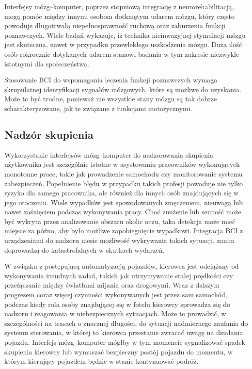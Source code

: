 \documentclass[skorowidz,skroty]{dyplomWEZUT}
\begin{document}
Interfejsy mózg--komputer, poprzez stopniową integrację z neurorehabilitacją, mogą pomóc między innymi osobom dotkniętym udarem mózgu, który często powoduje długotrwałą niepełnosprawność ruchową oraz zaburzenia funkcji poznawczych. Wiele badań wykazuje, iż technika nieinwazyjnej stymulacji mózgu jest skuteczna, nawet w przypadku przewlekłego uszkodzenia mózgu\cite{bci_lab}. Duża ilość osób rokrocznie dotykanych udarem stanowi badania w tym zakresie niezwykle istotnymi dla społeczeństwa.

Stosowanie BCI do wspomagania leczenia funkcji poznawczych wymaga skrupulatnej identyfikacji sygnałów mózgowych, które są możliwe do uzyskania. Może to być trudne, ponieważ nie wszystkie stany mózgu są tak dobrze scharakteryzowane, jak te związane z funkcjami motorycznymi\cite{bci_handbook}.



\subsection{Nadzór skupienia}
Wykorzystanie interfejsów mózg--komputer do nadzorowania skupienia użytkownika jest szczególnie istotne w asystowaniu pracowników wykonujących monotonne prace, takie jak prowadzenie samochodu czy monitorowanie systemu zabezpieczeń. Popełnienie błędu w przypadku takich profesji powoduje nie tylko ryzyko dla samego pracownika, ale również dla innych osób znajdujących się w jego otoczeniu. Wiele wypadków jest spowodowanych zmęczeniem, nieuwagą lub nawet zaśnięciem podczas wykonywania pracy. Choć znużenie lub senność może być wykryta przez analizowanie obszaru okolic oczu, taka detekcja może mieć miejsce za późno, aby było możliwe zapobiegnięcie wypadkowi. Integracja BCI z urządzeniami do nadzoru niesie możliwość wykrywania takich sytuacji, zanim doprowadzą do katastrofalnych w skutkach wydarzeń. 

W związku z postępującą automatyzacją pojazdów, kierowca jest odciążany od wykonywania żmudnych zadań, takich jak utrzymywanie stałej prędkości czy przełączanie między światłami mijania oraz drogowymi. Wraz z dalszym progresem coraz więcej czynności wykonywanych jest przez sam samochód, podczas kiedy rola osoby znajdującej się w fotelu kierowcy sprowadza się do nadzoru i reagowania w niebezpiecznych sytuacjach. Może to prowadzić, w szczególności na trasach o znacznej długości, do sytuacji nadmiernego zaufania do systemu sterowania, w której to kierowca przestanie zwracać uwagę na działania pojazdu. Interfejs mózg--komputer mógłby w tym momencie sygnalizować spadek skupienia kierowcy lub wymuszać bezpieczny postój pojazdu do momentu, w którym kierujący pojazdem będzie w stanie kontynuować podróż.
\end{document}

